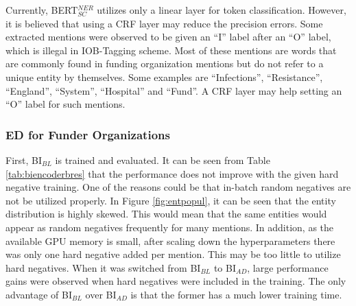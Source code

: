 \documentclass{report}
\theoremstyle{definition}
\theoremstyle{remark}
\begin{document}



Currently, BERT$_{SC}^{NER}$ utilizes only a linear layer for token classification. However, it is believed that using a CRF layer may reduce the precision errors. Some extracted mentions were observed to be given an ``I'' label after an ``O'' label, which is illegal in IOB-Tagging scheme. Most of these mentions are words that are commonly found in funding organization mentions but do not refer to a unique entity by themselves. Some examples are ``Infections'', ``Resistance'', ``England'', ``System'', ``Hospital'' and ``Fund''. A CRF layer may help setting an ``O'' label for such mentions.

\subsubsection{ED for Funder Organizations}

First, BI$_{BL}$ is trained and evaluated. It can be seen from Table \ref{tab:biencoderbres} that the performance does not improve with the given hard negative training. One of the reasons could be that in-batch random negatives are not be utilized properly. In Figure \ref{fig:entpopul}, it can be seen that the entity distribution is highly skewed. This would mean that the same entities would appear as random negatives frequently for many mentions. In addition, as the available GPU memory is small, after scaling down the hyperparameters there was only one hard negative added per mention. This may be too little to utilize hard negatives. When it was switched from BI$_{BL}$ to BI$_{AD}$, large performance gains were observed when hard negatives were included in the training. The only advantage of BI$_{BL}$ over BI$_{AD}$ is that the former has a much lower training time.
\end{document}
